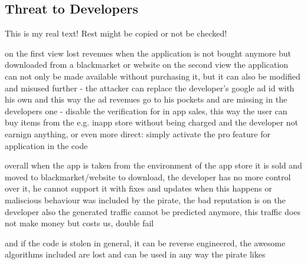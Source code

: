 \subsection{Threat to Developers} \label{subsection:foundation-piracy-developers}
This is my real text! Rest might be copied or not be checked!

on the first view lost revenues when the application is not bought anymore but downloaded from a blackmarket or website
on the second view the application can not only be made available without purchasing it, but it can also be modified and misused further
- the attacker can replace the developer's google ad id with his own and this way the ad revenues go to his pockets and are missing in the developers one
- disable the verification for in app sales, this way the user can buy items from the e.g. inapp store without being charged and the developer not earnign anything, or even more direct: simply activate the pro feature for application in the code

overall when the app is taken from the environment of the app store it is sold  and moved to blackmarket/website to download, the developer has no more control over it, he cannot support it with fixes and updates
when this happens or maliscious behaviour was included by the pirate, the bad reputation is on the developer
also the generated traffic cannot be predicted anymore, this traffic does not make money but costs us, double fail

and if the code is stolen in general, it can be reverse engineered,  the awesome algorithms included are lost and can be used in any way the pirate likes
\cite{lierschDeveloperThreats}
